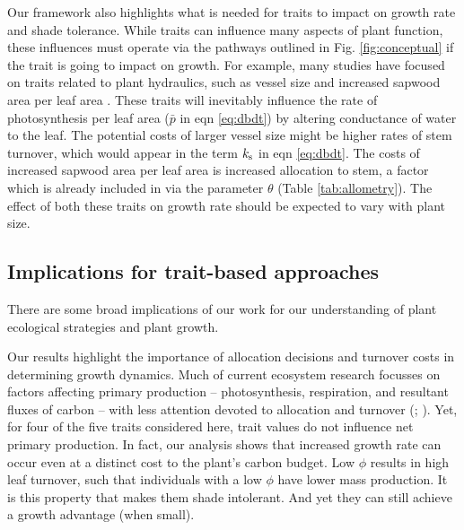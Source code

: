 \documentclass[9pt,twocolumn,twoside]{pnas-new}
\begin{document}
Our framework also highlights what is needed for traits to impact on growth rate and shade tolerance. While traits can influence many aspects of plant function, these influences must operate via the pathways outlined in Fig. \ref{fig:conceptual} if the trait is going to impact on growth. For example, many studies have focused on traits related to plant hydraulics, such as vessel size and increased sapwood area per leaf area \citep{Zanne-2010}. These traits will inevitably influence the rate of photosynthesis per leaf area ($\bar{p}$ in eqn \ref{eq:dbdt}) by altering conductance of water to the leaf. The potential costs of larger vessel size might be higher rates of stem turnover, which would appear in the term $k_{\rm s}$ in eqn \ref{eq:dbdt}. The costs of increased sapwood area per leaf area is increased allocation to stem, a factor which is already included in via the parameter $\theta$ (Table \ref{tab:allometry}). The effect of both these traits on growth rate should be expected to vary with plant size.

\subsection{Implications for trait-based approaches}
There are some broad implications of our work for our understanding of plant ecological strategies and plant growth.

Our results highlight the importance of allocation decisions and turnover costs in determining growth dynamics. Much of current ecosystem research focusses on factors affecting primary production -- photosynthesis, respiration, and resultant fluxes of carbon -- with less attention devoted to allocation and turnover (\citealp{Friend-2014}; \citealp[for comparisons of models see][]{Sitch-2008, DeKauwe-2014}). Yet, for four of the five traits considered here, trait values do not influence net primary production. In fact, our analysis  shows that increased growth rate can occur even at a distinct cost to the plant's carbon budget. Low $\phi$ results in high leaf turnover, such that individuals with a low $\phi$ have lower mass production. It is this property that makes them shade intolerant. And yet they can still achieve a growth advantage (when small).
\end{document}
